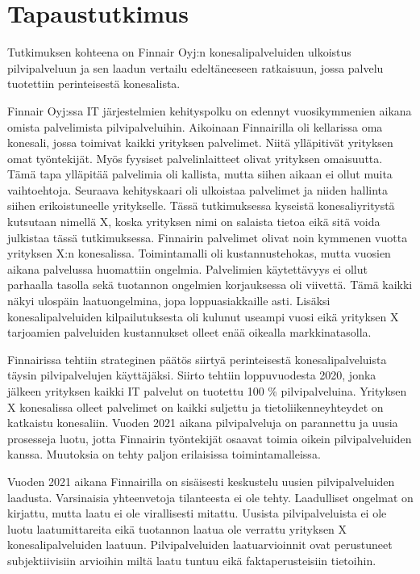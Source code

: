 \chapter{Tapaustutkimus\label{tapautustutkimus}}
Tutkimuksen kohteena on Finnair Oyj:n konesalipalveluiden ulkoistus pilvipalveluun ja sen laadun vertailu edeltäneeseen ratkaisuun, jossa palvelu tuotettiin perinteisestä konesalista.

Finnair Oyj:ssa IT järjestelmien kehityspolku on edennyt vuosikymmenien aikana omista palvelimista pilvipalveluihin. Aikoinaan Finnairilla oli kellarissa oma konesali, jossa toimivat kaikki yrityksen palvelimet. Niitä ylläpitivät yrityksen omat työntekijät. Myös fyysiset palvelinlaitteet olivat yrityksen omaisuutta. Tämä tapa ylläpitää palvelimia oli kallista, mutta siihen aikaan ei ollut muita vaihtoehtoja. Seuraava kehityskaari oli ulkoistaa palvelimet ja niiden hallinta siihen erikoistuneelle yritykselle. Tässä tutkimuksessa kyseistä konesaliyritystä kutsutaan nimellä X, koska yrityksen nimi on salaista tietoa eikä sitä voida julkistaa tässä tutkimuksessa. Finnairin palvelimet olivat noin kymmenen vuotta yrityksen X:n konesalissa. Toimintamalli oli kustannustehokas, mutta vuosien aikana palvelussa huomattiin ongelmia. Palvelimien käytettävyys ei ollut parhaalla tasolla sekä tuotannon ongelmien korjauksessa oli viivettä. Tämä kaikki näkyi ulospäin laatuongelmina, jopa loppuasiakkaille asti. Lisäksi konesalipalveluiden kilpailutuksesta oli kulunut useampi vuosi eikä yrityksen X tarjoamien palveluiden kustannukset olleet enää oikealla markkinatasolla.

Finnairissa tehtiin strateginen päätös siirtyä perinteisestä konesalipalveluista täysin pilvipalvelujen käyttäjäksi. Siirto tehtiin loppuvuodesta 2020, jonka jälkeen yrityksen kaikki IT palvelut on tuotettu 100 \% pilvipalveluina. Yrityksen X konesalissa olleet palvelimet on kaikki suljettu ja tietoliikenneyhteydet on katkaistu konesaliin. Vuoden 2021 aikana pilvipalveluja on parannettu ja uusia prosesseja luotu, jotta Finnairin työntekijät osaavat toimia oikein pilvipalveluiden kanssa. Muutoksia on tehty paljon erilaisissa toimintamalleissa.

Vuoden 2021 aikana Finnairilla on sisäisesti keskustelu uusien pilvipalveluiden laadusta. Varsinaisia yhteenvetoja tilanteesta ei ole tehty. Laadulliset ongelmat on kirjattu, mutta laatu ei ole virallisesti mitattu. Uusista pilvipalveluista ei ole luotu laatumittareita eikä tuotannon laatua ole verrattu yrityksen X konesalipalveluiden laatuun. Pilvipalveluiden laatuarvioinnit ovat perustuneet subjektiivisiin arvioihin miltä laatu tuntuu eikä faktaperusteisiin tietoihin. 
